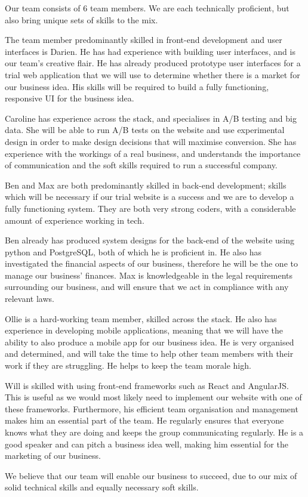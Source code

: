 Our team consists of 6 team members. We are each technically proficient, but also bring unique sets of skills to the mix.

The team member predominantly skilled in front-end development and user interfaces is Darien. He has had experience with building user interfaces, and is our team’s creative flair. He has already produced prototype user interfaces for a trial web application that we will use to determine whether there is a market for our business idea. His skills will be required to build a fully functioning, responsive UI for the business idea.

Caroline has experience across the stack, and specialises in A/B testing and big data. She will be able to run A/B tests on the website and use experimental design in order to make design decisions that will maximise conversion. She has experience with the workings of a real business, and understands the importance of communication and the soft skills required to run a successful company.

Ben and Max are both predominantly skilled in back-end development; skills which will be necessary if our trial website is a success and we are to develop a fully functioning system. They are both very strong coders, with a considerable amount of experience working in tech.

Ben already has produced system designs for the back-end of the website using python and PostgreSQL, both of which he is proficient in. He also has investigated the financial aspects of our business, therefore he will be the one to manage our business’ finances. Max is knowledgeable in the legal requirements surrounding our business, and will ensure that we act in compliance with any relevant laws.

Ollie is a hard-working team member, skilled across the stack. He also has experience in developing mobile applications, meaning that we will have the ability to also produce a mobile app for our business idea. He is very organised and determined, and will take the time to help other team members with their work if they are struggling. He helps to keep the team morale high.

Will is skilled with using front-end frameworks such as React and AngularJS. This is useful as we would most likely need to implement our website with one of these frameworks. Furthermore, his efficient team organisation and management makes him an essential part of the team. He regularly ensures that everyone knows what they are doing and keeps the group communicating regularly. He is a good speaker and can pitch a business idea well, making him essential for the marketing of our business.

We believe that our team will enable our business to succeed, due to our mix of solid  technical skills and equally necessary soft skills.
